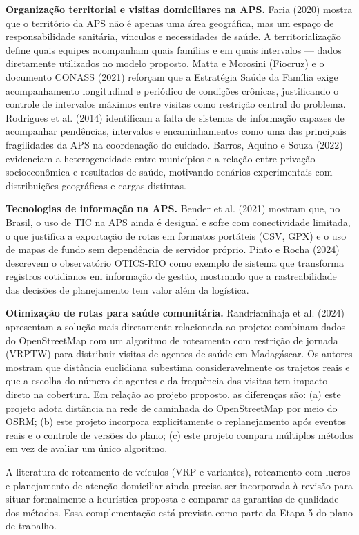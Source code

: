 \documentclass[11pt,a4paper]{article}
\begin{document}
\textbf{Organização territorial e visitas domiciliares na APS.} Faria
(2020) mostra que o território da APS não é apenas uma área geográfica,
mas um espaço de responsabilidade sanitária, vínculos e necessidades de
saúde. A territorialização define quais equipes acompanham quais
famílias e em quais intervalos --- dados diretamente utilizados no
modelo proposto. Matta e Morosini (Fiocruz) e o documento CONASS (2021)
reforçam que a Estratégia Saúde da Família exige acompanhamento
longitudinal e periódico de condições crônicas, justificando o controle
de intervalos máximos entre visitas como restrição central do problema.
Rodrigues et al. (2014) identificam a falta de sistemas de informação
capazes de acompanhar pendências, intervalos e encaminhamentos como uma
das principais fragilidades da APS na coordenação do cuidado. Barros,
Aquino e Souza (2022) evidenciam a heterogeneidade entre municípios e a
relação entre privação socioeconômica e resultados de saúde, motivando
cenários experimentais com distribuições geográficas e cargas distintas.

\textbf{Tecnologias de informação na APS.} Bender et al. (2021) mostram
que, no Brasil, o uso de TIC na APS ainda é desigual e sofre com
conectividade limitada, o que justifica a exportação de rotas em
formatos portáteis (CSV, GPX) e o uso de mapas de fundo sem dependência
de servidor próprio. Pinto e Rocha (2024) descrevem o observatório
OTICS-RIO como exemplo de sistema que transforma registros cotidianos em
informação de gestão, mostrando que a rastreabilidade das decisões de
planejamento tem valor além da logística.

\textbf{Otimização de rotas para saúde comunitária.} Randriamihaja et
al. (2024) apresentam a solução mais diretamente relacionada ao projeto:
combinam dados do OpenStreetMap com um algoritmo de roteamento com
restrição de jornada (VRPTW) para distribuir visitas de agentes de saúde
em Madagáscar. Os autores mostram que distância euclidiana subestima
consideravelmente os trajetos reais e que a escolha do número de agentes
e da frequência das visitas tem impacto direto na cobertura. Em relação
ao projeto proposto, as diferenças são: (a) este projeto adota distância
na rede de caminhada do OpenStreetMap por meio do OSRM; (b) este projeto incorpora explicitamente o replanejamento após
eventos reais e o controle de versões do plano; (c) este projeto compara
múltiplos métodos em vez de avaliar um único algoritmo.

A literatura de roteamento de veículos (VRP e variantes), roteamento com
lucros e planejamento de atenção domiciliar ainda precisa ser
incorporada à revisão para situar formalmente a heurística proposta e
comparar as garantias de qualidade dos métodos. Essa complementação está
prevista como parte da Etapa 5 do plano de trabalho.
\end{document}
